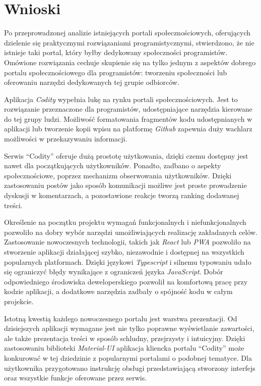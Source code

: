 \documentclass[a4paper,12pt,polish,twoside]{extreport}
\begin{document}
\chapter{Wnioski}
Po przeprowadzonej analizie istniejących portali społecznościowych, oferujących dzielenie się praktycznymi rozwiązaniami programistycznymi, stwierdzono, że nie istnieje taki portal, który byłby dedykowany społeczności programistów. Omówione rozwiązania cechuje skupienie się na tylko jednym z aspektów dobrego portalu społecznościowego dla programistów: tworzeniu społeczności lub oferowaniu narzędzi dedykowanych tej grupie odbiorców.

Aplikacja \textit{Codity} wypełnia lukę na rynku portali społecznościowych. Jest to rozwiązanie przeznaczone dla programistów, udostępniające narzędzia kierowane do tej grupy ludzi. Możliwość formatowania fragmentów kodu udostępnianych w aplikacji lub tworzenie kopii wpisu na platformę \textit{Github} zapewnia duży wachlarz możliwości w przekazywaniu informacji.

Serwis ``Codity'' oferuje dużą prostotę użytkowania, dzięki czemu dostępny jest nawet dla początkujących użytkowników. Ponadto, zadbano o aspekty społecznościowe, poprzez mechanizm obserwowania użytkowników. Dzięki zastosowaniu postów jako sposób komunikacji możliwe jest proste prowadzenie dyskusji w komentarzach, a pozostawione reakcje tworzą ranking dodawanej treści.

Określenie na początku projektu wymagań funkcjonalnych i niefunkcjonalnych pozwoliło na dobry wybór narzędzi umożliwiających realizację zakładanych celów. Zastosowanie nowoczesnych technologii, takich jak \textit{React} lub \textit{PWA} pozwoliło na stworzenie aplikacji działającej szybko, niezawodnie i dostępnej na wszystkich popularnych platformach. Dzięki językowi \textit{Typescript} i silnemu typowaniu udało się ograniczyć błędy wynikające z ograniczeń języka \textit{JavaScript}. Dobór odpowiedniego środowiska deweloperskiego pozwolił na komfortową pracę przy kodzie aplikacji, a dodatkowe narzędzia zadbały o spójność kodu w całym projekcie.

Istotną kwestią każdego nowoczesnego portalu jest warstwa prezentacji. Od dzisiejszych aplikacji wymagane jest nie tylko poprawne wyświetlanie zawartości, ale także prezentacja treści w sposób schludny, przejrzysty i intuicyjny. Dzięki zastosowaniu biblioteki \textit{Material-UI} aplikacja kliencka portalu ``Codity'' może konkurować w tej dziedzinie z popularnymi portalami o podobnej tematyce. Dla użytkownika przygotowano instrukcję obsługi przedstawiającą stworzony interfejs oraz wszystkie funkcje oferowane przez serwis.
\end{document}
